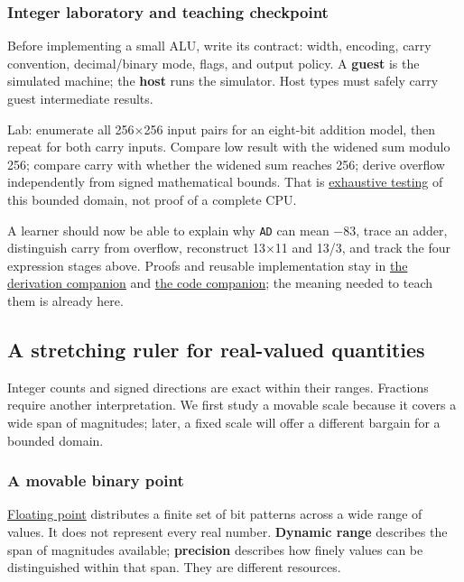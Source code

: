 \subsubsection{Integer laboratory and teaching checkpoint}\label{05-engine-i-ch001-integer-laboratory-and-teaching-checkpoint}

Before implementing a small ALU, write its contract: width, encoding, carry convention, decimal/binary mode, flags, and output policy. A \textbf{guest} is the simulated machine; the \textbf{host} runs the simulator. Host types must safely carry guest intermediate results.

Lab: enumerate all 256×256 input pairs for an eight-bit addition model, then repeat for both carry inputs. Compare low result with the widened sum modulo 256; compare carry with whether the widened sum reaches 256; derive overflow independently from signed mathematical bounds. That is \hyperref[appendix-05db24ccc28a]{exhaustive testing} of this bounded domain, not proof of a complete CPU.

A learner should now be able to explain why \texttt{AD} can mean −83, trace an adder, distinguish carry from overflow, reconstruct 13×11 and 13/3, and track the four expression stages above. Proofs and reusable implementation stay in \hyperref[01-foundations-i-ch011-m002---signed-representations-adders-and-arithmetic-policies]{the derivation companion} and \hyperref[appendix-4e2236f53445-m002---exhaustive-8-bit-addition-oracle-and-saturation]{the code companion}; the meaning needed to teach them is already here.

\subsection{A stretching ruler for real-valued quantities}\label{05-engine-i-ch001-a-stretching-ruler-for-real-valued-quantities}

Integer counts and signed directions are exact within their ranges. Fractions require another interpretation. We first study a movable scale because it covers a wide span of magnitudes; later, a fixed scale will offer a different bargain for a bounded domain.

\subsubsection{A movable binary point}\label{05-engine-i-ch001-a-movable-binary-point}

\hyperref[appendix-343615f49ddf]{Floating point} distributes a finite set of bit patterns across a wide range of values. It does not represent every real number. \textbf{Dynamic range} describes the span of magnitudes available; \textbf{precision} describes how finely values can be distinguished within that span. They are different resources.

